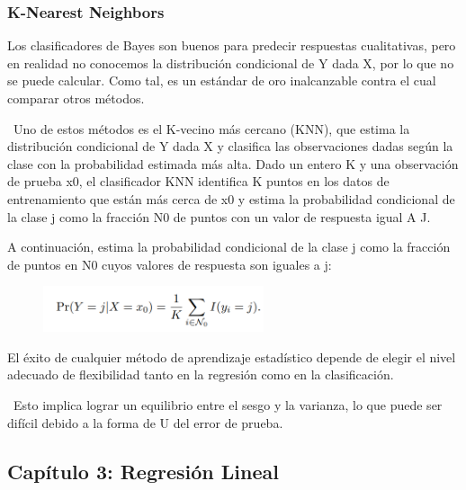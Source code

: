 \documentclass[
  letterpaper,
  DIV=11,
  numbers=noendperiod]{scrartcl}
\begin{document}
\hypertarget{k-nearest-neighbors}{%
\subsubsection{\texorpdfstring{\textbf{K-Nearest
Neighbors}}{K-Nearest Neighbors}}\label{k-nearest-neighbors}}

Los clasificadores de Bayes son buenos para predecir respuestas
cualitativas, pero en realidad no conocemos la distribución condicional
de Y dada X, por lo que no se puede calcular. Como tal, es un estándar
de oro inalcanzable contra el cual comparar otros métodos.

~Uno de estos métodos es el K-vecino más cercano (KNN), que estima la
distribución condicional de Y dada X y clasifica las observaciones dadas
según la clase con la probabilidad estimada más alta. Dado un entero K y
una observación de prueba x0, el clasificador KNN identifica K puntos en
los datos de entrenamiento que están más cerca de x0 y estima la
probabilidad condicional de la clase j como la fracción N0 de puntos con
un valor de respuesta igual A J.

A continuación, estima la probabilidad condicional de la clase j como la
fracción de puntos en N0 cuyos valores de respuesta son iguales a j:

\begin{figure}

{\centering \includegraphics[width=2.55208in,height=\textheight]{images/figura10.png}

}

\end{figure}

El éxito de cualquier método de aprendizaje estadístico depende de
elegir el nivel adecuado de flexibilidad tanto en la regresión como en
la clasificación.

~Esto implica lograr un equilibrio entre el sesgo y la varianza, lo que
puede ser difícil debido a la forma de U del error de prueba.

\hypertarget{capuxedtulo-3-regresiuxf3n-lineal}{%
\subsection{\texorpdfstring{\textbf{Capítulo 3: Regresión
Lineal}}{Capítulo 3: Regresión Lineal}}\label{capuxedtulo-3-regresiuxf3n-lineal}}
\end{document}
